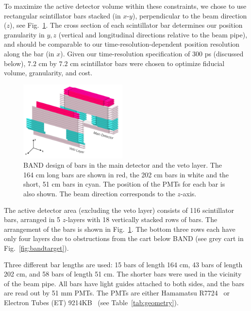 \documentclass[3p,final,twocolumn]{elsarticle}
\begin{document}
To maximize the active detector volume within these constraints, we
chose to use rectangular scintillator bars stacked (in $x$-$y$), perpendicular to
the beam direction ($z$), see Fig.~\ref{fig:design}.  The cross
section of each scintillator bar determines our position granularity
in $y,z$ (vertical and longitudinal directions relative to the beam
pipe), and should be comparable to our time-resolution-dependent position
resolution along the bar (in $x$). Given our time-resolution specification of
$300$ \si{\pico\second} (discussed below), $7.2$
\si{\centi\meter} by $7.2$ \si{\centi\meter} scintillator bars were
chosen to optimize fiducial volume, granularity, and cost.


\begin{figure}[tb]
	\centering
			\includegraphics[width=0.48\textwidth]{band-schematic.pdf}
            \caption{BAND design of bars in the main
                   detector and the veto layer. The 164 \si{\centi\meter} long bars are shown in
                          red, the 202 \si{\centi\meter} bars in white
                          and the short, 51 \si{\centi\meter} bars in cyan. The position of
                          the PMTs for each bar is also shown. The beam direction corresponds to the $z$-axis.   }
		\label{fig:design}
\end{figure}

The active detector area (excluding the veto layer) consists of 116 scintillator bars, arranged
in 5 $z$-layers with 18 vertically stacked rows of bars. The arrangement of the
bars is shown in Fig.~\ref{fig:design}. The bottom three rows each have only
four layers due to obstructions from the cart below BAND (see grey cart in Fig.~\ref{fig:bandtarget}).

Three different bar lengths are used: 15 bars of length 164 \si{\centi\meter}, 43 bars of length 202 \si{\centi\meter}, and 58 bars of length 
51 \si{\centi\meter}. The shorter bars were used in the vicinity of
the beam pipe. All bars have light guides attached to both sides, and the bars
are read out by 51 \si{\milli\meter} PMTs. The PMTs are either Hamamatsu R7724~\cite{pmtR7724} or Electron Tubes (ET) 9214KB~\cite{pmt9214} (see Table~\ref{tab:geometry}).
\end{document}

